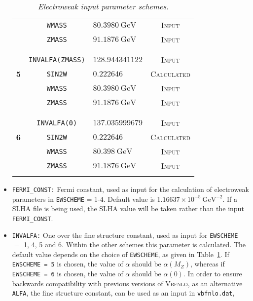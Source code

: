\documentclass[english,12pt]{article}
\begin{document}
\begin{itemize}
\begin{table}[t!]
\begin{center}
\begin{tabular}{c|c|l|c}
 &{\tt  WMASS} & $80.3980 \ \mathrm{GeV}$ & \textsc{Input}\\
 &{\tt  ZMASS} & $91.1876 \ \mathrm{GeV}$ & \textsc{Input}\\
&&&\\
\hline
&&&\\
 &{\tt  INVALFA(ZMASS)} & $ 128.944341122$ & \textsc{Input}\\
\bf 5 &{\tt  SIN2W} & $0.222646$ & \textsc{Calculated}\\
 &{\tt  WMASS} & $80.3980 \ \mathrm{GeV}$ & \textsc{Input}\\
 &{\tt  ZMASS} & $91.1876 \ \mathrm{GeV}$ & \textsc{Input}\\
&&&\\
\hline
&&&\\
 &{\tt  INVALFA(0)} & $137.035999679$ & \textsc{Input}\\
\bf 6 &{\tt  SIN2W} & $0.222646$ & \textsc{Calculated}\\
 &{\tt  WMASS} & $80.398 \ \mathrm{GeV}$ & \textsc{Input}\\
 &{\tt  ZMASS} & $91.1876 \ \mathrm{GeV}$ & \textsc{Input}\\
&&&\\
\end{tabular}
\caption {\em  Electroweak input parameter schemes.}
\vspace{0.2cm}
\label{tab:Schemes}
\end{center}
\end{table}
\item {\tt FERMI\_CONST:} Fermi constant, used as input for the calculation of
electroweak parameters in {\tt EWSCHEME} = 1-4. Default value is $1.16637 \times
10^{-5} \ \mathrm{GeV}^{-2}$.  If a SLHA file is being used, the SLHA value will
be taken rather than the input {\tt FERMI\_CONST}. 
\item {\tt INVALFA:} One over the fine structure constant, used as input for
{\tt EWSCHEME} $=$ 1, 4, 5 and 6.  Within the other schemes this parameter is
calculated. The default value depends on the choice of {\tt EWSCHEME}, as given
in Table~\ref{tab:Schemes}.  If {\tt EWSCHEME = 5} is chosen, the value of
$\alpha$ should be $\alpha(M_{Z})$, whereas if {\tt EWSCHEME = 6} is chosen, the
value of $\alpha$ should be $\alpha(0)$.  In order to ensure backwards
compatibility with previous versions of \textsc{Vbfnlo}, as an alternative {\tt
ALFA}, the fine structure constant, can be used as an input in {\tt vbfnlo.dat},

\end{itemize}
\end{document}
